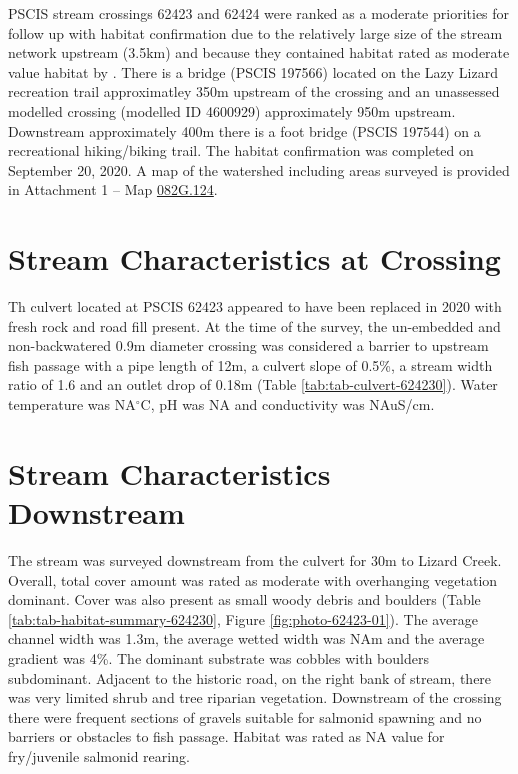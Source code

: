 \documentclass[
]{book}
\begin{document}
PSCIS stream crossings 62423 and 62424 were ranked as a moderate priorities for follow up with habitat confirmation due to the relatively large size of the stream network upstream (3.5km) and because they contained habitat rated as moderate value habitat by \citet{vastFishPassage2013}. There is a bridge (PSCIS 197566) located on the Lazy Lizard recreation trail approximatley 350m upstream of the crossing and an unassessed modelled crossing (modelled ID 4600929) approximately 950m upstream. Downstream approximately 400m there is a foot bridge (PSCIS 197544) on a recreational hiking/biking trail. The habitat confirmation was completed on September 20, 2020. A map of the watershed including areas surveyed is provided in Attachment 1 -- Map \href{https://hillcrestgeo.ca/outgoing/fishpassage/projects/elk/FishPassage_082G.124.pdf}{082G.124}.

\hypertarget{stream-characteristics-at-crossing-3}{%
\section*{Stream Characteristics at Crossing}\label{stream-characteristics-at-crossing-3}}

Th culvert located at PSCIS 62423 appeared to have been replaced in 2020 with fresh rock and road fill present. At the time of the survey, the un-embedded and non-backwatered 0.9m diameter crossing was considered a barrier to upstream fish passage with a pipe length of 12m, a culvert slope of 0.5\%, a stream width ratio of 1.6 and an outlet drop of 0.18m (Table \ref{tab:tab-culvert-624230}). Water temperature was NA\(^\circ\)C, pH was NA and conductivity was NAuS/cm.

\hypertarget{stream-characteristics-downstream-3}{%
\section*{Stream Characteristics Downstream}\label{stream-characteristics-downstream-3}}

The stream was surveyed downstream from the culvert for 30m to Lizard Creek. Overall, total cover amount was rated as moderate with overhanging vegetation dominant. Cover was also present as small woody debris and boulders (Table \ref{tab:tab-habitat-summary-624230}, Figure \ref{fig:photo-62423-01}). The average channel width was 1.3m, the average wetted width was NAm and the average gradient was 4\%. The dominant substrate was cobbles with boulders subdominant. Adjacent to the historic road, on the right bank of stream, there was very limited shrub and tree riparian vegetation. Downstream of the crossing there were frequent sections of gravels suitable for salmonid spawning and no barriers or obstacles to fish passage. Habitat was rated as NA value for fry/juvenile salmonid rearing.
\end{document}
